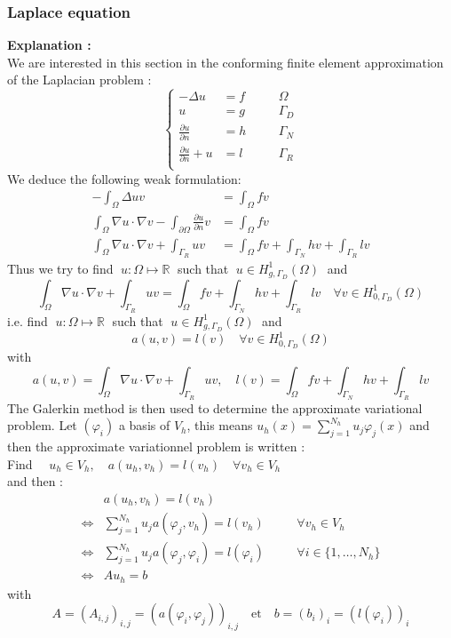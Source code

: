\subsubsection{Laplace equation}

\textbf{Explanation :} \\
We are interested in this section in the conforming finite element approximation of the Laplacian problem :
\begin{equation}
	\left\{\begin{aligned}
		-\Delta u &= f \quad&&\Omega \\
		u&=g \quad&&\Gamma_D \\
		\frac{\partial u}{\partial n} &=h \quad &&\Gamma_N \\
		\frac{\partial u}{\partial n}+u &=l \quad &&\Gamma_R \\
	\end{aligned}\right.
\end{equation}
We deduce the following weak formulation:
\begin{align*}
	-\int_\Omega \Delta u v &= \int_\Omega fv \\
	\int_\Omega \nabla u \cdot \nabla v - \int_{\partial\Omega}\frac{\partial u}{\partial n}v &= \int_\Omega fv \\
	\int_\Omega \nabla u \cdot \nabla v + \int_{\Gamma_R}uv &= \int_\Omega fv + \int_{\Gamma_N}hv+\int_{\Gamma_R}lv
\end{align*}
Thus we try to find $\; u:\Omega \mapsto \mathbb{R} \;$ such that $\; u\in H_{g,\Gamma_D}^1(\Omega) \;$ and
\begin{equation*}
	\int_\Omega \nabla u \cdot \nabla v + \int_{\Gamma_R}uv = \int_\Omega fv + \int_{\Gamma_N}hv+\int_{\Gamma_R}lv \quad \forall v\in H_{0,\Gamma_D}^1(\Omega)
\end{equation*}
i.e. find $\; u:\Omega \mapsto \mathbb{R} \;$ such that $\; u\in H_{g,\Gamma_D}^1(\Omega) \;$ and
\begin{equation*}
	a(u,v)=l(v)  \quad \forall v\in H_{0,\Gamma_D}^1(\Omega)
\end{equation*}
with
$$a(u,v)=\int_\Omega \nabla u \cdot \nabla v + \int_{\Gamma_R}uv, \quad l(v)=\int_\Omega fv + \int_{\Gamma_N}hv+\int_{\Gamma_R}lv$$
The Galerkin method is then used to determine the approximate variational problem. Let $(\varphi_i)$ a basis of $V_h$, this means $u_h(x)=\sum_{j=1}^{N_h}u_j\varphi_j(x)$ and then the approximate variationnel problem is written : \\
Find $\quad u_h\in V_h, \quad a(u_h,v_h)=l(v_h) \quad \forall v_h\in V_h$ \\
and then :
$$\begin{aligned}
	&a(u_h,v_h)=l(v_h) \\
	\iff &\sum_{j=1}^{N_h}u_ja(\varphi_j,v_h)=l(v_h) \quad &&\forall v_h\in V_h \\
	\iff &\sum_{j=1}^{N_h}u_ja(\varphi_j,\varphi_i)=l(\varphi_i) \quad &&\forall i\in\{1,\dots,N_h\} \\
	\iff &Au_h=b
\end{aligned}$$
with
$$A=(A_{i,j})_{i,j}=(a(\varphi_i,\varphi_j))_{i,j} \quad  \text{et} \quad b=(b_i)_i=(l(\varphi_i))_i$$

